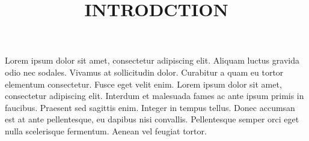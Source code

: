 
\chapter{}
\begin{center}
\title{\textup{\textbf{\large{INTRODCTION}}}}
\end{center}
Lorem ipsum dolor sit amet, consectetur adipiscing elit. Aliquam luctus gravida odio nec sodales. Vivamus at sollicitudin dolor. Curabitur a quam eu tortor elementum consectetur. Fusce eget velit enim. Lorem ipsum dolor sit amet, consectetur adipiscing elit. Interdum et malesuada fames ac ante ipsum primis in faucibus. Praesent sed sagittis enim. Integer in tempus tellus. Donec accumsan est at ante pellentesque, eu dapibus nisi convallis. Pellentesque semper orci eget nulla scelerisque fermentum. Aenean vel feugiat tortor.


